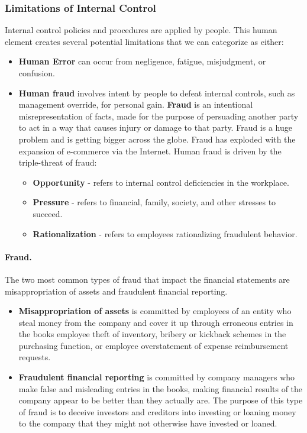 \documentclass[../main.tex]{subfiles}
\begin{document}
	\subsubsection{Limitations of Internal Control}
	
	Internal control policies and procedures are applied by people. This human 
	element creates several potential limitations that we can categorize as 
	either:
	\begin{itemize}[noitemsep]
		\item \textbf{Human Error} can occur from negligence, fatigue, 
		misjudgment, or confusion.
		\item \textbf{Human fraud} involves intent by people to defeat internal 
		controls, such as management override, for personal gain. 
		\textbf{Fraud} is an 
		intentional misrepresentation of facts, made for the purpose of 
		persuading another party to act in a way that causes injury or damage 
		to that party. Fraud is a huge problem and is getting bigger across the 
		globe. Fraud has exploded with the expansion of e-commerce via the 
		Internet. Human fraud is driven by the triple-threat of fraud:
		\begin{itemize}[noitemsep]
			\item \textbf{Opportunity} - refers to internal control 
			deficiencies in the workplace. 
			\item \textbf{Pressure} - refers to financial, family, society, and 
			other stresses to succeed.  
			\item \textbf{Rationalization} - refers to employees rationalizing 
			fraudulent behavior. 
		\end{itemize}
	\end{itemize}

	\paragraph{Fraud.} The two most common types of fraud that impact the 
	financial statements are misappropriation of assets and fraudulent 
	financial reporting. 
	\begin{itemize}[noitemsep]
		\item \textbf{Misappropriation of assets} is committed by employees of 
		an entity who steal money from the company and cover it up through 
		erroneous entries in the books \eg employee theft of inventory, bribery 
		or kickback schemes in the purchasing function, or employee 
		overstatement of expense reimbursement requests.
		\item \textbf{Fraudulent financial reporting} is committed by company 
		managers who make false and misleading entries in the books, making 
		financial results of the company appear to be better than they actually 
		are. The purpose of this type of fraud is to deceive investors and 
		creditors into investing or loaning money to the company that they 
		might not otherwise have invested or loaned.
	\end{itemize}
	
\end{document}
